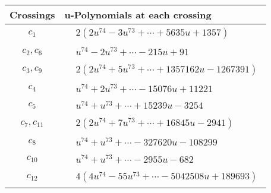 \documentclass[1p]{elsarticle_modified}
\theoremstyle{definition}
\begin{document}
\begin{tabular}{m{50pt}|m{274pt}}
Crossings & \hspace{64pt}u-Polynomials at each crossing \\
\hline $$\begin{aligned}c_{1}\end{aligned}$$&$\begin{aligned}
&2(2 u^{74}-3 u^{73}+\cdots+5635 u+1357)
\end{aligned}$\\
\hline $$\begin{aligned}c_{2},c_{6}\end{aligned}$$&$\begin{aligned}
&u^{74}-2 u^{73}+\cdots-215 u+91
\end{aligned}$\\
\hline $$\begin{aligned}c_{3},c_{9}\end{aligned}$$&$\begin{aligned}
&2(2 u^{74}+5 u^{73}+\cdots+1357162 u-1267391)
\end{aligned}$\\
\hline $$\begin{aligned}c_{4}\end{aligned}$$&$\begin{aligned}
&u^{74}+2 u^{73}+\cdots-15076 u+11221
\end{aligned}$\\
\hline $$\begin{aligned}c_{5}\end{aligned}$$&$\begin{aligned}
&u^{74}+u^{73}+\cdots+15239 u-3254
\end{aligned}$\\
\hline $$\begin{aligned}c_{7},c_{11}\end{aligned}$$&$\begin{aligned}
&2(2 u^{74}+7 u^{73}+\cdots+16845 u-2941)
\end{aligned}$\\
\hline $$\begin{aligned}c_{8}\end{aligned}$$&$\begin{aligned}
&u^{74}+u^{73}+\cdots-327620 u-108299
\end{aligned}$\\
\hline $$\begin{aligned}c_{10}\end{aligned}$$&$\begin{aligned}
&u^{74}+u^{73}+\cdots-2955 u-682
\end{aligned}$\\
\hline $$\begin{aligned}c_{12}\end{aligned}$$&$\begin{aligned}
&4(4 u^{74}-55 u^{73}+\cdots-5042508 u+189693)
\end{aligned}$\\
\hline
\end{tabular}\\~\\
\end{document}
